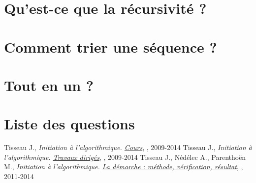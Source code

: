 \documentclass[11pt,a4paper,colorlinks,breaklinks]{article}
\begin{document}
\newpage
\section{Qu'est-ce que la récursivité ?}\label{sec:recursivite}
	

\newpage
\section{Comment trier une séquence ?}\label{sec:sequences}
	

\newpage
\section{Tout en un ?}\label{sec:conclusion}
	

\newpage
\section*{Liste des questions}\label{annexe:questions}

\newpage
\begin{thebibliography}{99}\label{annexe:biblio}
 Tisseau J., \emph{Initiation à l'algorithmique. \href{http://www.enib.fr/~tisseau/pdf/course/info-S1.pdf}{Cours}}, \enib, 2009-2014
 Tisseau J., \emph{Initiation à l'algorithmique. \href{http://www.enib.fr/~tisseau/pdf/course/td-info-S1.pdf}{Travaux dirigés}}, \enib, 2009-2014
 Tisseau J., Nédélec A., Parenthoën M., \emph{Initiation à l'algorithmique. \href{http://www.enib.fr/~tisseau/pdf/course/mvr-paper.pdf}{La démarche \mvr : méthode, vérification, résultat}}, \enib, 2011-2014
\end{thebibliography}

\label{fin}
\end{document}
